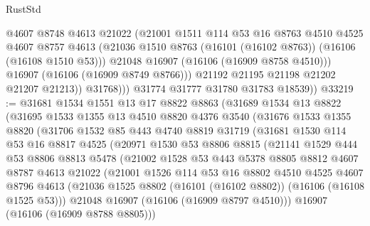 \begin{lexlean}{RustStd}
\begin{coremodule}
                    @4607
                    @8748
                    @4613
                    @21022
                    (@21001
                      @1511
                      @114
                      @53
                      @16
                      @8763
                      @4510
                      @4525
                      @4607
                      @8757
                      @4613
                      (@21036 @1510 @8763 (@16101 (@16102 @8763)) (@16106 (@16108 @1510 @53)))
                      @21048
                      @16907
                      (@16106 (@16909 @8758 @4510)))
                    @16907
                    (@16106 (@16909 @8749 @8766)))
                  @21192
                  @21195
                  @21198
                  @21202
                  @21207
                  @21213))
              @31768)))
        @31774
        @31777
        @31780
        @31783
        @18539))
@33219 := @31681
    @1534
    @1551
    @13
    @17
    @8822
    @8863
    (@31689
      @1534
      @13
      @8822
      (@31695
        @1533
        @1355
        @13
        @4510
        @8820
        @4376
        @3540
        (@31676
          @1533
          @1355
          @8820
          (@31706
            @1532
            @85
            @443
            @4740
            @8819
            @31719
            (@31681
              @1530
              @114
              @53
              @16
              @8817
              @4525
              (@20971
                @1530
                @53
                @8806
                @8815
                (@21141
                  @1529
                  @444
                  @53
                  @8806
                  @8813
                  @5478
                  (@21002
                    @1528
                    @53
                    @443
                    @5378
                    @8805
                    @8812
                    @4607
                    @8787
                    @4613
                    @21022
                    (@21001
                      @1526
                      @114
                      @53
                      @16
                      @8802
                      @4510
                      @4525
                      @4607
                      @8796
                      @4613
                      (@21036 @1525 @8802 (@16101 (@16102 @8802)) (@16106 (@16108 @1525 @53)))
                      @21048
                      @16907
                      (@16106 (@16909 @8797 @4510)))
                    @16907
                    (@16106 (@16909 @8788 @8805)))

\end{coremodule}
\end{lexlean}
